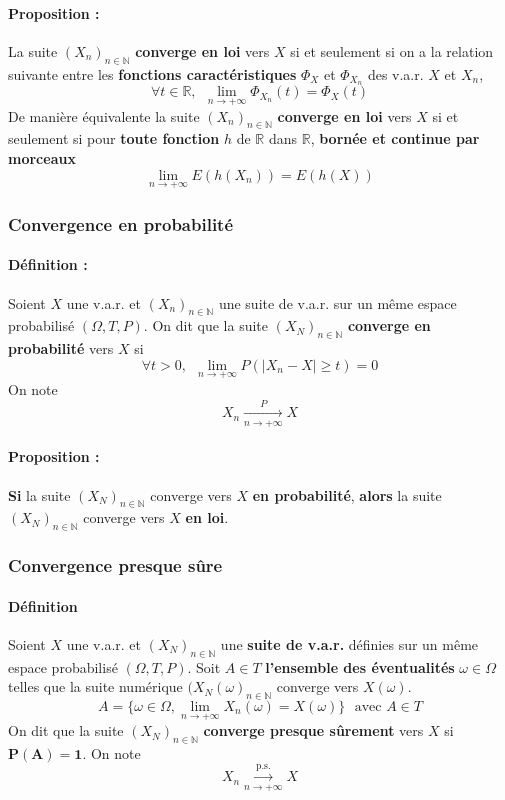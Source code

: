 \documentclass[10pt,a4paper,twoside]{article}
\begin{document}
\paragraph{Proposition :} La suite $(X_{n})_{n\in\mathbb{N}}$ \textbf{converge en loi} vers $X$ si et seulement si on a la relation suivante entre les \textbf{fonctions caractéristiques} $\Phi_{X}$ et $\Phi_{X_{n}}$ des v.a.r. $X$ et $X_{n}$,
$$\forall t\in\mathbb{R},\ \ \lim\limits_{n\rightarrow+\infty}\Phi_{X_{n}}(t)=\Phi_{X}(t)$$
De manière équivalente la suite $(X_{n})_{n\in\mathbb{N}}$ \textbf{converge en loi} vers $X$ si et seulement si pour \textbf{toute fonction} $h$ de $\mathbb{R}$ dans $\mathbb{R}$, \textbf{bornée et continue par morceaux}
$$\lim\limits_{n\rightarrow+\infty} E(h(X_{n}))=E(h(X))$$

\subsubsection{Convergence en probabilité}
\paragraph{Définition :} Soient $X$ une v.a.r. et $(X_{n})_{n\in\mathbb{N}}$ une suite de v.a.r. sur un même espace probabilisé $(\Omega,T,P)$. On dit que la suite $(X_{N})_{n\in\mathbb{N}}$ \textbf{converge en probabilité} vers $X$ si
$$\forall t > 0,\ \ \lim\limits_{n\rightarrow+\infty} P(|X_{n}-X|\geqslant t)=0$$
On note
$$X_{n}\underset{n\rightarrow+\infty}{\overset{P}{\longrightarrow}}X$$

\paragraph{Proposition :} \textbf{Si} la suite $(X_{N})_{n\in\mathbb{N}}$ converge vers $X$ \textbf{en probabilité}, \textbf{alors} la suite $(X_{N})_{n\in\mathbb{N}}$ converge vers $X$ \textbf{en loi}.

\subsubsection{Convergence presque sûre}
\paragraph{Définition} Soient $X$ une v.a.r. et $(X_{N})_{n\in\mathbb{N}}$ une \textbf{suite de v.a.r.} définies sur un même espace probabilisé $(\Omega,T,P)$. Soit $A\in T$ \textbf{l'ensemble des éventualités} $\omega\in\Omega$ telles que la suite numérique $(X_{N}(\omega)_{n\in\mathbb{N}}$ converge vers $X(\omega)$.
$$A = \{\omega\in\Omega, \lim\limits_{n\rightarrow+\infty}X_{n}(\omega)=X(\omega)\}\ \ \ \text{avec }A\in T$$
On dit que la suite $(X_{N})_{n\in\mathbb{N}}$ \textbf{converge presque sûrement} vers $X$ si $\mathbf{P(A)=1}$. On note
$$X_{n}\overset{\text{p.s.}}{\underset{n\rightarrow+\infty}{\longrightarrow}} X$$
\end{document}
